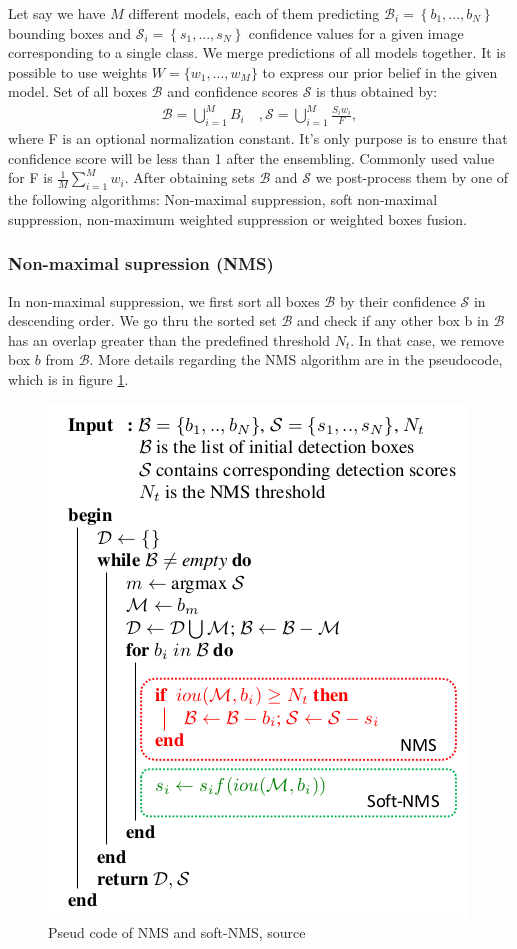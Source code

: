 Let say we have $M$ different models, each of them predicting $\mathcal{B}_i = \left\{b_1,...,b_N \right\} $ bounding boxes and $\mathcal{S}_i = \left\{ s_1,...,s_N \right\} $ confidence values for a given image corresponding to a single class. We merge predictions of all models together. It is possible to use weights $\mathit{W} = \{w_1,...,w_M \}$ to express our prior belief in the given model. Set of all boxes $\mathcal{B}$ and confidence scores $\mathcal{S}$ is thus obtained by:
\begin{align}
    \mathcal{B} = \bigcup_{i=1}^{M} B_i \quad, \mathcal{S} = \bigcup_{i=1}^{M} \frac{S_i  w_i}{ F},
    \label{eq:ensembling_weighting}
\end{align}
where F is an optional normalization constant. It's only purpose is to ensure that confidence score will be less than 1 after the ensembling. Commonly used value for F is $\frac{1}{M} \sum_{i=1}^M w_i$. After obtaining sets $\mathcal{B}$ and $\mathcal{S}$ we post-process them by one of the following algorithms: Non-maximal suppression, soft non-maximal suppression, non-maximum weighted suppression or weighted boxes fusion.

\subsubsection{Non-maximal supression (NMS)}
In non-maximal suppression, we first sort all boxes $\mathcal{B}$ by their confidence $\mathcal{S}$ in descending order. We go thru the sorted set $\mathcal{B}$ and check if any other box b in $\mathcal{B}$ has an overlap greater than the predefined threshold $N_t$.  In that case, we remove box $b$ from $\mathcal{B}$. More details regarding the NMS algorithm are in the pseudocode, which is in figure \ref{alg:nms}.
\begin{figure}
    \centering
    \includegraphics[width=0.5\linewidth]{images/nms_algo.png}
    \caption{Pseud code of NMS and soft-NMS, source \cite{Bodla2017}}
    \label{alg:nms}
\end{figure}


